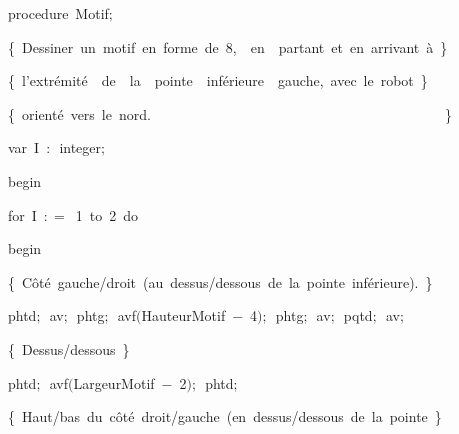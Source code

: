 {\pagebreak[3] 
\vspace{\neglskip}\mbox{\blc  \blk\idt  \mcl procedure\idt \ Motif$;$}\par 
\vspace{\neglskip}\mbox{\blc  \blk\blk\idt  \cmt  \{\ Dessiner\ un\ motif\ en\ forme\ de\ 8,\ \ en\ \ partant\ et\ en\ arrivant\ à\ \}\idt }\par 
\vspace{\neglskip}\mbox{\blc  \blk\blk\idt  \cmt  \{\ l{'}extrémité\ \ de\ \ la\ \ pointe\ \ inférieure\ \ gauche,\ avec\ le\ robot\ \}\idt }\par 
\vspace{\neglskip}\mbox{\blc  \blk\blk\idt  \cmt  \{\ orienté\ vers\ le\ nord.\ \ \ \ \ \ \ \ \ \ \ \ \ \ \ \ \ \ \ \ \ \ \ \ \ \ \ \ \ \ \ \ \ \ \ \ \ \ \ \ \ \ \}\idt }\par 
\pagebreak[3] 
\vspace{\neglskip}\mbox{\blc  \blk\blk\idt  \mcl var\idt \ I\ $:$\ integer$;$}\par 
\vspace{\neglskip}\mbox{\blc  \blk\idt  \mcl begin\idt }\par 
\pagebreak[3] 
\vspace{\neglskip}\mbox{\blc  \blk\blk\idt  \mcl for\idt \ I\ $:$$=$\ 1\ \mcl to\idt \ 2\ \mcl do\idt }\par 
\vspace{\neglskip}\mbox{\blc  \blk\blk\blk\idt  \mcl begin\idt }\par 
\vspace{\neglskip}\mbox{\blc  \blk\blk\blk\blk\idt  \cmt  \{\ Côté\ gauche/droit\ (au\ dessus/dessous\ de\ la\ pointe\ inférieure).\ \}\idt }\par 
\vspace{\neglskip}\mbox{\blc  \blk\blk\blk\blk\idt  phtd$;$\ av$;$\ phtg$;$\ avf$($HauteurMotif\ $-$\ 4$)$$;$\ phtg$;$\ av$;$\ pqtd$;$\ av$;$\ }\par 
\vspace{\neglskip}\mbox{\blc  \blk\blk\blk\blk\idt  \cmt  \{\ Dessus/dessous\ \}\idt }\par 
\vspace{\neglskip}\mbox{\blc  \blk\blk\blk\blk\idt  phtd$;$\ avf$($LargeurMotif\ $-$\ 2$)$$;$\ phtd$;$\ }\par 
\vspace{\neglskip}\mbox{\blc  \blk\blk\blk\blk\idt  \cmt  \{\ Haut/bas\ du\ côté\ droit/gauche\ (en\ dessus/dessous\ de\ la\ pointe\ \}\idt }\par 
}
